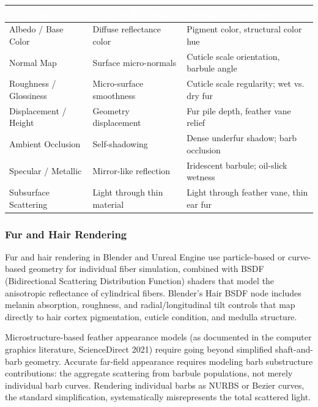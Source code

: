 \documentclass[11pt,letterpaper]{article}
\newcommand{\tableheader}[1]{\textbf{\sffamily\textcolor{white}{#1}}}
\begin{document}
\begin{center}
\begin{tabularx}{\textwidth}{L{3.5cm}XL{3.5cm}}
\toprule
{}
\tableheader{Map Type} & \tableheader{Physical Meaning} & \tableheader{Biological Correspondence} \\
\midrule
Albedo / Base Color & Diffuse reflectance color & Pigment color, structural color hue \\
Normal Map & Surface micro-normals & Cuticle scale orientation, barbule angle \\
Roughness / Glossiness & Micro-surface smoothness & Cuticle scale regularity; wet vs. dry fur \\
Displacement / Height & Geometry displacement & Fur pile depth, feather vane relief \\
Ambient Occlusion & Self-shadowing & Dense underfur shadow; barb occlusion \\
Specular / Metallic & Mirror-like reflection & Iridescent barbule; oil-slick wetness \\
Subsurface Scattering & Light through thin material & Light through feather vane, thin ear fur \\
\bottomrule
\end{tabularx}
\end{center}

\subsubsection{Fur and Hair Rendering}

Fur and hair rendering in Blender and Unreal Engine use particle-based or curve-based geometry for individual fiber simulation, combined with BSDF (Bidirectional Scattering Distribution Function) shaders that model the anisotropic reflectance of cylindrical fibers. Blender's Hair BSDF node includes melanin absorption, roughness, and radial/longitudinal tilt controls that map directly to hair cortex pigmentation, cuticle condition, and medulla structure.

Microstructure-based feather appearance models (as documented in the computer graphics literature, ScienceDirect 2021) require going beyond simplified shaft-and-barb geometry. Accurate far-field appearance requires modeling barb substructure contributions: the aggregate scattering from barbule populations, not merely individual barb curves. Rendering individual barbs as NURBS or Bezier curves, the standard simplification, systematically misrepresents the total scattered light.
\end{document}
